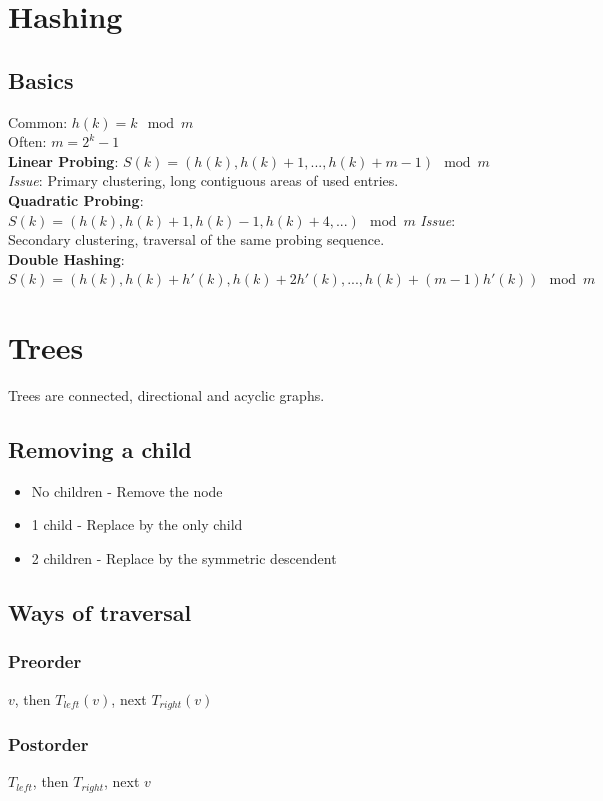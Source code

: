 \documentclass[9pt,landscape,a4paper, table]{extarticle}
\begin{document}
\begin{multicols*}{3}
\section{Hashing}

\subsection{Basics}
Common: $h(k) = k \mod m$\\
Often: $m = 2^k - 1$\\

\textbf{Linear Probing}: $S(k) = (h(k), h(k) + 1 ,..., h(k) + m - 1)\mod m$
\textit{Issue}: Primary clustering, long contiguous areas of used entries.\\ 
\textbf{Quadratic Probing}: $S(k) = (h(k), h(k) + 1, h(k) -1, h(k) + 4, ...)\mod m$ \textit{Issue}: Secondary clustering, traversal of the same probing sequence.\\ 
\textbf{Double Hashing}: $S(k) = (h(k),h(k)+h'(k),h(k)+2h'(k),...,h(k)+(m-1)h'(k))\mod m$

\section{Trees}
Trees are connected, directional and acyclic graphs.

\subsection{Removing a child}
\begin{itemize}
    \item No children - Remove the node
    \item 1 child - Replace by the only child
    \item 2 children - Replace by the symmetric descendent
\end{itemize}

\subsection{Ways of traversal}
\subsubsection{Preorder}
$v$, then $T_{left}(v)$, next $T_{right}(v)$
\subsubsection{Postorder}
$T_{left}$, then $T_{right}$, next $v$

\end{multicols*}
\end{document}
